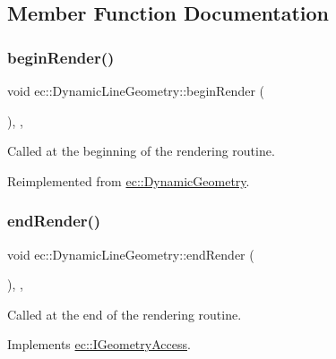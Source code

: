 \subsection{Member Function Documentation}
\mbox{\label{classec_1_1_dynamic_line_geometry_ada76857787fc930fd44382e838842687}} 
\subsubsection{\texorpdfstring{begin\+Render()}{beginRender()}}
{\footnotesize\ttfamily void ec\+::\+Dynamic\+Line\+Geometry\+::begin\+Render (\begin{DoxyParamCaption}{ }\end{DoxyParamCaption})\hspace{0.3cm}{\ttfamily [override]}, {\ttfamily [protected]}, {\ttfamily [virtual]}}

Called at the beginning of the rendering routine. 

Reimplemented from \mbox{\hyperlink{classec_1_1_dynamic_geometry_ae4eb49e852a4c300325a288bf9ea4408}{ec\+::\+Dynamic\+Geometry}}.

\mbox{\label{classec_1_1_dynamic_line_geometry_afe9e7118c1c0fc09bd94c72284bfdafd}} 
\subsubsection{\texorpdfstring{end\+Render()}{endRender()}}
{\footnotesize\ttfamily void ec\+::\+Dynamic\+Line\+Geometry\+::end\+Render (\begin{DoxyParamCaption}{ }\end{DoxyParamCaption})\hspace{0.3cm}{\ttfamily [override]}, {\ttfamily [protected]}, {\ttfamily [virtual]}}

Called at the end of the rendering routine. 

Implements \mbox{\hyperlink{classec_1_1_i_geometry_access_a6d3b9c34a8b73aeac26663ef349ce41f}{ec\+::\+I\+Geometry\+Access}}.


